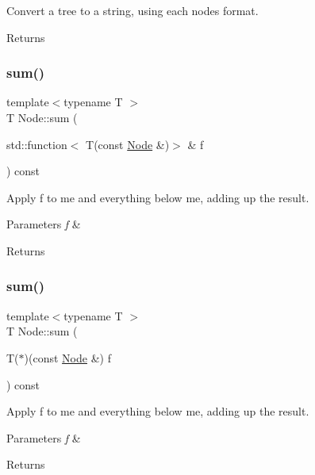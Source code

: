 Convert a tree to a string, using each node\textquotesingle{}s format. \begin{DoxyReturn}{Returns}

\end{DoxyReturn}
\mbox{\label{class_node_ac91282056a0df2835f1579bdd21c93e1}} 
\subsubsection{\texorpdfstring{sum()}{sum()}\hspace{0.1cm}{\footnotesize\ttfamily [1/2]}}
{\footnotesize\ttfamily template$<$typename T $>$ \\
T Node\+::sum (\begin{DoxyParamCaption}\item[{std\+::function$<$ T(const \hyperlink{class_node}{Node} \&)$>$ \&}]{f }\end{DoxyParamCaption}) const\hspace{0.3cm}{\ttfamily [inline]}}

Apply f to me and everything below me, adding up the result. 
\begin{DoxyParams}{Parameters}
{\em f} & \\
\hline
\end{DoxyParams}
\begin{DoxyReturn}{Returns}

\end{DoxyReturn}
\mbox{\label{class_node_a089e99addd93f91b2ef5a9d0c3e6bdeb}} 
\subsubsection{\texorpdfstring{sum()}{sum()}\hspace{0.1cm}{\footnotesize\ttfamily [2/2]}}
{\footnotesize\ttfamily template$<$typename T $>$ \\
T Node\+::sum (\begin{DoxyParamCaption}\item[{T($\ast$)(const \hyperlink{class_node}{Node} \&)}]{f }\end{DoxyParamCaption}) const\hspace{0.3cm}{\ttfamily [inline]}}

Apply f to me and everything below me, adding up the result. 
\begin{DoxyParams}{Parameters}
{\em f} & \\
\hline
\end{DoxyParams}
\begin{DoxyReturn}{Returns}

\end{DoxyReturn}
\mbox{\label{class_node_aa727c354e38f60fb1560d72ae1aaa9af}} 
